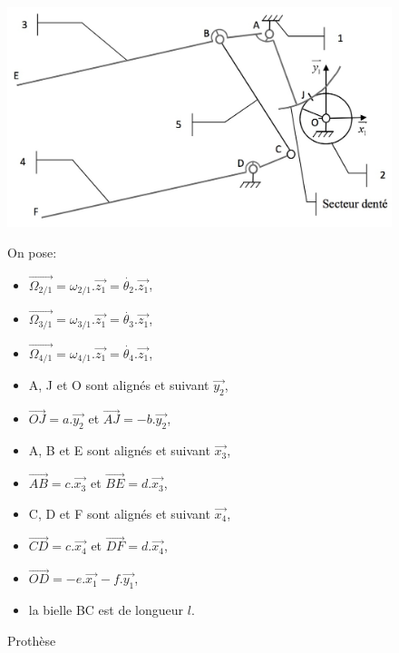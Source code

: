 \begin{figure}[!ht]
\begin{minipage}{0.5\linewidth}
\begin{center}
\includegraphics[width=\linewidth]{img/prothese_2}
\caption{Prothèse}
\label{fig:image21}
\end{center}
\end{minipage}\hfill
\begin{minipage}{0.45\linewidth}
On pose:
\begin{itemize}
 \item $\overrightarrow{\Omega_{2/1}}=\omega_{2/1}.\overrightarrow{z_1}=\dot{\theta_2}.\overrightarrow{z_1}$,
 \item $\overrightarrow{\Omega_{3/1}}=\omega_{3/1}.\overrightarrow{z_1}=\dot{\theta_3}.\overrightarrow{z_1}$, 
 \item $\overrightarrow{\Omega_{4/1}}=\omega_{4/1}.\overrightarrow{z_1}=\dot{\theta_4}.\overrightarrow{z_1}$, 
 \item A, J et O sont alignés et suivant $\overrightarrow{y_2}$,
 \item $\overrightarrow{OJ}=a.\overrightarrow{y_2}$ et $\overrightarrow{AJ}=-b.\overrightarrow{y_2}$,
 \item A, B et E sont alignés et suivant $\overrightarrow{x_3}$,
 \item $\overrightarrow{AB}=c.\overrightarrow{x_3}$ et $\overrightarrow{BE}=d.\overrightarrow{x_3}$,
 \item C, D et F sont alignés et suivant $\overrightarrow{x_4}$,
 \item $\overrightarrow{CD}=c.\overrightarrow{x_4}$ et $\overrightarrow{DF}=d.\overrightarrow{x_4}$,
 \item $\overrightarrow{OD}=-e.\overrightarrow{x_1}-f.\overrightarrow{y_1}$,
 \item la bielle BC est de longueur $l$. 
 \end{itemize}
\end{minipage}
\end{figure}



